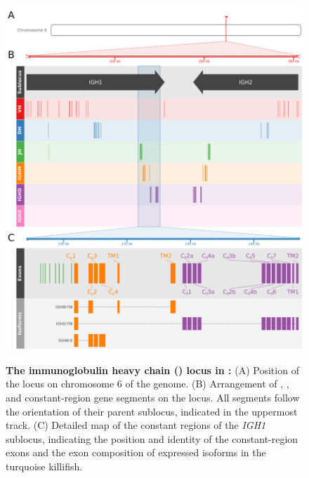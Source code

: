 \begin{figure}
	\centering
	\includegraphics[width=\textwidth]{_Figures/png/nfu-locus-map} %
			    \begin{subfigure}{0em}
        \label{fig:nfu-locus-map-a}
    \end{subfigure}
    \begin{subfigure}{0em}
        \label{fig:nfu-locus-map-b}
    \end{subfigure}
    \begin{subfigure}{0em}
        \label{fig:nfu-locus-map-c}
        \end{subfigure}
	\caption[The immunoglobulin heavy chain (\igh{}) locus in \nfu]{\textbf{The immunoglobulin heavy chain (\igh{}) locus in \nfu:} (A) Position of the \igh{} locus on chromosome 6 of the \Nfu genome. (B) Arrangement of \vh, \dh, \jh and constant-region gene segments on the \Nfu \igh{} locus. All segments follow the orientation of their parent sublocus, indicated in the uppermost track. (C) Detailed map of the constant regions of the \textit{IGH1} sublocus, indicating the position and identity of the constant-region exons and the exon composition of expressed \igh{} isoforms in the turquoise killifish.}
	\label{fig:nfu-locus-map}
	\end{figure}
	
